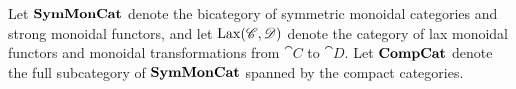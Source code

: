 \documentclass[12pt,oneside,article,draft]{memoir}
\begin{document}
Let $\mathbf{SymMonCat}$ denote the bicategory of symmetric monoidal categories and strong monoidal functors, and let $\operatorname{Lax}(\mathscr{C},\mathscr{D})$ denote the category of lax monoidal functors and monoidal transformations from $\cat{C}$ to $\cat{D}$. Let $\mathbf{CompCat}$ denote the full subcategory of $\mathbf{SymMonCat}$ spanned by the compact categories.

\end{document}
